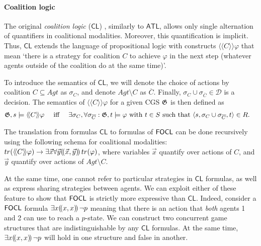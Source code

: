 \documentclass{article}
\theoremstyle{definition}
\begin{document}
 \paragraph{Coalition logic} The original \textit{coalition logic} ($\mathsf{CL}$) \cite{pauly02}, similarly to $\mathsf{ATL}$, allows only single alternation of quantifiers in coalitional modalities. Moreover, this quantification is implicit. Thus, $\mathsf{CL}$ extends the language of propositional logic with constructs $\langle \! \langle C \rangle \! \rangle \varphi$ that mean `there is a strategy for coalition $C$ to achieve $\varphi$ in the next step (whatever agents outside of the coalition do at the same time)'. 
 
 To introduce the semantics of $\mathsf{CL}$, we will denote the choice of actions by coalition $C \subseteq Agt$ as $\sigma_C$, and denote $Agt \setminus C$ as $\overline{C}$. Finally, $\sigma_C \cup \sigma_{\overline{C}} \in \mathcal{D}$ is a decision. The semantics of $\langle \! \langle C \rangle \! \rangle \varphi$ for a given CGS $\mathfrak{G}$ is then defined as 
  \begin{alignat*}{3}
        &\mathfrak{G},s \models \langle \! \langle C \rangle \! \rangle \varphi && \text{ iff } && \exists \sigma_C, \forall \sigma_{\overline{C}} : \mathfrak{G},t \models \varphi \text{ with } t \in S \text{ such that } \langle s, \sigma_C \cup \sigma_{\overline{C}}, t \rangle \in R.   
\end{alignat*}     
 
The translation from formulas $\mathsf{CL}$ to formulas of $\mathsf{FOCL}$ can be done recursively using the following schema for coalitional modalities: 
$tr(\langle \! \langle C \rangle \! \rangle \varphi) \to \exists \vec x \forall \vec y (\!( \vec x, \vec y )\!)\, tr(\varphi)$, 
where variables $\vec x$ quantify over actions of $C$, and $\vec y$ quantify over actions of $Agt \setminus C$. 

At the same time, one cannot refer to particular strategies in $\mathsf{CL}$ formulas, as well as express sharing strategies between agents. We can exploit either of these feature to show that $\mathsf{FOCL}$ is strictly more expressive than $\mathsf{CL}$. 
Indeed, consider a $\mathsf{FOCL}$ formula $\exists x (\!( x, x )\!)\, \lnot p$ meaning that there is an action that \textit{both} agents 1 and 2 can use to reach a $p$-state. We can construct two concurrent game structures that are indistinguishable by any $\mathsf{CL}$ formulas. At the same time,   $\exists x (\!( x, x )\!)\, \lnot p$ will hold in one structure and false in another. 
\end{document}
